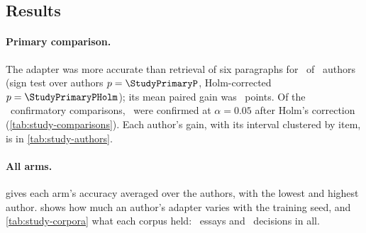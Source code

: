 


\subsection{Results}\label{sec:replication-results}

\paragraph{Primary comparison.} The adapter was more accurate than retrieval of six
paragraphs for \StudyPrimaryImproved\ of \StudyPrimaryMeasured\ authors (sign test over
authors $p = \StudyPrimaryP$, Holm-corrected $p = \StudyPrimaryPHolm$); its mean paired gain
was \StudyPrimaryMeanGain\ points. Of the \StudyConfirmatory\ confirmatory comparisons,
\StudyConfirmed\ were confirmed at $\alpha = 0.05$ after Holm's correction
(\cref{tab:study-comparisons}). Each author's gain, with its interval clustered by item, is
in \cref{tab:study-authors}.

\begin{table}[t]
\centering\small

\caption{Every comparison the protocol names, over the \StudyAuthors\ authors. An author is
better when its paired gain is positive. The confirmatory family comes first, with Holm's
correction; the exploratory comparisons below it are uncorrected.}
\label{tab:study-comparisons}
\end{table}

\begin{table}[t]
\centering\small

\caption{Each author's accuracy under retrieval and the adapter (mean over its
\StudyTrainingSeeds\ training seeds), on \StudyItemsPerAuthor\ items, with the paired gain
and its 95\% interval clustered by item, the items the adapter alone answered right and
wrong, and the exact sign test over items.}
\label{tab:study-authors}
\end{table}

\paragraph{All arms.}  gives each arm's accuracy averaged over the
authors, with the lowest and highest author.  shows how much an
author's adapter varies with the training seed, and \cref{tab:study-corpora} what each
corpus held: \StudyArticlesKept\ essays and \StudyDecisionsKept\ decisions in all.


